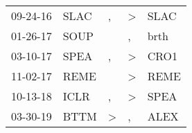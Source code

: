 \begin{supertabular}{p{0.07\textwidth}p{0.06\textwidth}p{0.02\textwidth}p{0.02\textwidth}p{0.06\textwidth}}
 09-24-16\textsuperscript{} &  SLAC\textsuperscript{} &             , &     \textgreater &           SLAC\textsuperscript{} \\
 01-26-17\textsuperscript{} &  SOUP\textsuperscript{} &               &                , &           brth\textsuperscript{} \\
 03-10-17\textsuperscript{} &  SPEA\textsuperscript{} &             , &     \textgreater &           CRO1\textsuperscript{} \\
 11-02-17\textsuperscript{} &  REME\textsuperscript{} &               &     \textgreater &           REME\textsuperscript{} \\
 10-13-18\textsuperscript{} &  ICLR\textsuperscript{} &             , &     \textgreater &           SPEA\textsuperscript{} \\
 03-30-19\textsuperscript{} &  BTTM\textsuperscript{} &  \textgreater &                , &           ALEX\textsuperscript{} \\
\end{supertabular}

